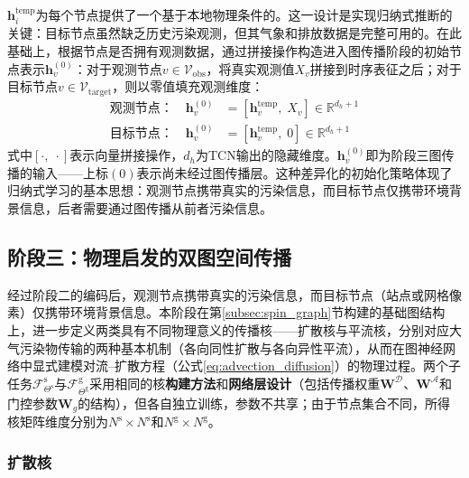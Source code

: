 $\mathbf{h}_i^{\text{temp}}$为每个节点提供了一个基于本地物理条件的。这一设计是实现归纳式推断的关键：目标节点虽然缺乏历史污染观测，但其气象和排放数据是完整可用的。在此基础上，根据节点是否拥有观测数据，通过拼接操作构造进入图传播阶段的初始节点表示$\mathbf{h}_v^{(0)}$：对于观测节点$v \in \mathcal{V}_{\text{obs}}$，将真实观测值$X_v$拼接到时序表征之后；对于目标节点$v \in \mathcal{V}_{\text{target}}$，则以零值填充观测维度：
\begin{align}
\text{观测节点：} \quad \mathbf{h}_v^{(0)} &= [\mathbf{h}_v^{\text{temp}},\; X_v] \in \mathbb{R}^{d_h+1} \label{eq:obs_init} \\
\text{目标节点：} \quad \mathbf{h}_v^{(0)} &= [\mathbf{h}_v^{\text{temp}},\; 0] \in \mathbb{R}^{d_h+1} \label{eq:target_init}
\end{align}
\noindent 式中$[\cdot,\;\cdot]$表示向量拼接操作，$d_h$为TCN输出的隐藏维度。$\mathbf{h}_v^{(0)}$即为阶段三图传播的输入——上标$(0)$表示尚未经过图传播层。这种差异化的初始化策略体现了归纳式学习的基本思想：观测节点携带真实的污染信息，而目标节点仅携带环境背景信息，后者需要通过图传播从前者污染信息。


\subsection{阶段三：物理启发的双图空间传播}
\label{subsec:stage3_propagation}

经过阶段二的编码后，观测节点携带真实的污染信息，而目标节点（站点或网格像素）仅携带环境背景信息。本阶段在第\ref{subsec:spin_graph}节构建的基础图结构上，进一步定义两类具有不同物理意义的传播核——扩散核与平流核，分别对应大气污染物传输的两种基本机制（各向同性扩散与各向异性平流），从而在图神经网络中显式建模对流--扩散方程（公式\eqref{eq:advection_diffusion}）的物理过程。两个子任务$\mathcal{F}^{\text{s}}_{\Theta^{\text{s}}}$与$\mathcal{F}^{\text{g}}_{\Theta^{\text{g}}}$采用相同的核\textbf{构建方法}和\textbf{网络层设计}（包括传播权重$\mathbf{W}^{\mathcal{D}}$、$\mathbf{W}^{\mathcal{A}}$和门控参数$\mathbf{W}_g$的结构），但各自独立训练，参数不共享；由于节点集合不同，所得核矩阵维度分别为$N^{\text{s}} \times N^{\text{s}}$和$N^{\text{g}} \times N^{\text{g}}$。


\subsubsection{扩散核}

